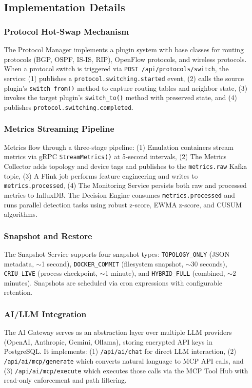 \documentclass[10pt,a4paper]{article}
\begin{document}
\subsection{Implementation Details}

\subsubsection{Protocol Hot-Swap Mechanism}
The Protocol Manager implements a plugin system with base classes for routing protocols (BGP, OSPF, IS-IS, RIP), OpenFlow protocols, and wireless protocols. When a protocol switch is triggered via \texttt{POST /api/protocols/switch}, the service: (1) publishes a \texttt{protocol.switching.started} event, (2) calls the source plugin's \texttt{switch\_from()} method to capture routing tables and neighbor state, (3) invokes the target plugin's \texttt{switch\_to()} method with preserved state, and (4) publishes \texttt{protocol.switching.completed}.

\subsubsection{Metrics Streaming Pipeline}
Metrics flow through a three-stage pipeline: (1) Emulation containers stream metrics via gRPC \texttt{StreamMetrics()} at 5-second intervals, (2) The Metrics Collector adds topology and device tags and publishes to the \texttt{metrics.raw} Kafka topic, (3) A Flink job performs feature engineering and writes to \texttt{metrics.processed}, (4) The Monitoring Service persists both raw and processed metrics to InfluxDB. The Decision Engine consumes \texttt{metrics.processed} and runs parallel detection tasks using robust z-score, EWMA z-score, and CUSUM algorithms.

\subsubsection{Snapshot and Restore}
The Snapshot Service supports four snapshot types: \texttt{TOPOLOGY\_ONLY} (JSON metadata, $\sim$1 second), \texttt{DOCKER\_COMMIT} (filesystem snapshot, $\sim$30 seconds), \texttt{CRIU\_LIVE} (process checkpoint, $\sim$1 minute), and \texttt{HYBRID\_FULL} (combined, $\sim$2 minutes). Snapshots are scheduled via cron expressions with configurable retention.

\subsubsection{AI/LLM Integration}
The AI Gateway serves as an abstraction layer over multiple LLM providers (OpenAI, Anthropic, Gemini, Ollama), storing encrypted API keys in PostgreSQL. It implements: (1) \texttt{/api/ai/chat} for direct LLM interaction, (2) \texttt{/api/ai/mcp/generate} which converts natural language to MCP API calls, and (3) \texttt{/api/ai/mcp/execute} which executes those calls via the MCP Tool Hub with read-only enforcement and path filtering.
\end{document}
